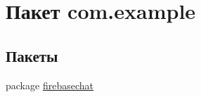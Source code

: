 \hypertarget{namespacecom_1_1example}{}\section{Пакет com.\+example}
\label{namespacecom_1_1example}
\subsection*{Пакеты}
\begin{DoxyCompactItemize}
\item 
package \mbox{\hyperlink{namespacecom_1_1example_1_1firebasechat}{firebasechat}}
\end{DoxyCompactItemize}
